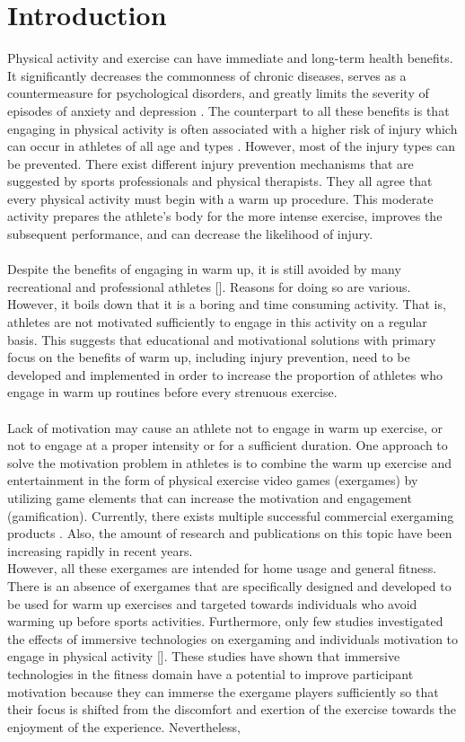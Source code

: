 \chapter{Introduction}
\label{chap:intro}
Physical activity and exercise can have immediate and long-term health benefits. It significantly decreases the commonness of chronic diseases, serves as a countermeasure for psychological disorders, and greatly limits the severity of episodes of anxiety and depression \cite{mayr2015prevention, warburton2006health}. The counterpart to all these benefits is that engaging in physical activity is often associated with a higher risk of injury which can occur in athletes of all age and types \cite{van1997severity}. However, most of the injury types can be prevented. There exist different injury prevention mechanisms that are suggested by sports professionals and physical therapists. They all agree that every physical activity must begin with a warm up procedure.  This moderate activity prepares the athlete's body for the more intense exercise, improves the subsequent performance, and can decrease the likelihood of injury. \\\\Despite the benefits of engaging in warm up, it is still avoided by many recreational and professional athletes []. Reasons for doing so are various. However, it boils down that it is a boring and time consuming activity. That is, athletes are not motivated sufficiently to engage in this activity on a regular basis. This suggests that educational and motivational solutions with primary focus on the benefits of warm up, including injury prevention, need to be developed and implemented in order to increase the proportion of athletes who engage in warm up routines before every strenuous exercise.\\\\  Lack of motivation may cause an athlete not to engage in warm up exercise, or not to engage at a proper intensity or for a sufficient duration. One approach to solve the motivation problem in athletes is to combine the warm up exercise and entertainment in the form of physical exercise video games (exergames) by utilizing game elements that can increase the motivation and engagement (gamification). Currently, there exists multiple successful commercial exergaming products \cite{wii, dance}. Also, the amount of research and publications on this topic have  been increasing rapidly in recent years.\\ However, all these exergames are intended for home usage and general fitness. There is an absence of exergames that are specifically designed and developed to be used for warm up exercises and targeted towards individuals who avoid warming up before sports activities. Furthermore, only few studies investigated the effects of immersive technologies on exergaming and individuals motivation to engage in physical activity []. These studies have shown that immersive technologies in the fitness domain have a potential to improve participant motivation because they can immerse the exergame players sufficiently so that their focus is shifted from the discomfort and exertion of the exercise towards the enjoyment of the experience. Nevertheless, 